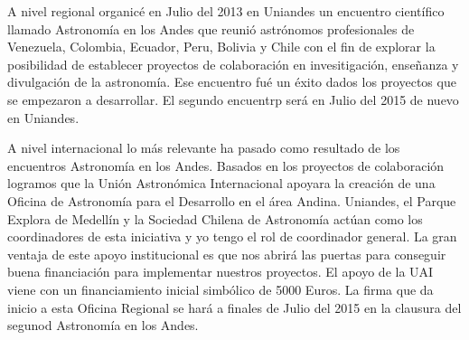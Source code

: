 \documentclass{report}
\begin{document}
A nivel regional organicé en Julio del 2013 en Uniandes un encuentro científico
llamado Astronomía en los Andes que reunió astrónomos profesionales de
Venezuela, Colombia, Ecuador, Peru, Bolivia y Chile con el fin de
explorar la posibilidad de establecer proyectos de colaboración en
invesitigación, enseñanza y divulgación de la astronomía. Ese
encuentro fué un éxito dados los proyectos que se empezaron a
desarrollar. El segundo encuentrp será en Julio del 2015 de nuevo en
Uniandes. 

A nivel internacional lo más relevante ha pasado como resultado de los
encuentros Astronomía en los Andes. Basados en los proyectos de
colaboración logramos que la Unión Astronómica Internacional apoyara
la creación de una Oficina de Astronomía para el Desarrollo en el área
Andina. Uniandes, el Parque Explora de Medellín y la Sociedad Chilena
de Astronomía actúan como los coordinadores de esta iniciativa y yo
tengo el rol de coordinador general. La gran ventaja de este apoyo
institucional es que nos abrirá las puertas para conseguir buena
financiación para implementar nuestros proyectos. El apoyo de la UAI
viene con un financiamiento inicial simbólico de 5000 Euros. La firma
que da inicio a esta Oficina Regional se hará a finales de Julio del
2015 en la clausura del segunod Astronomía en los Andes. 
 
\end{document}

